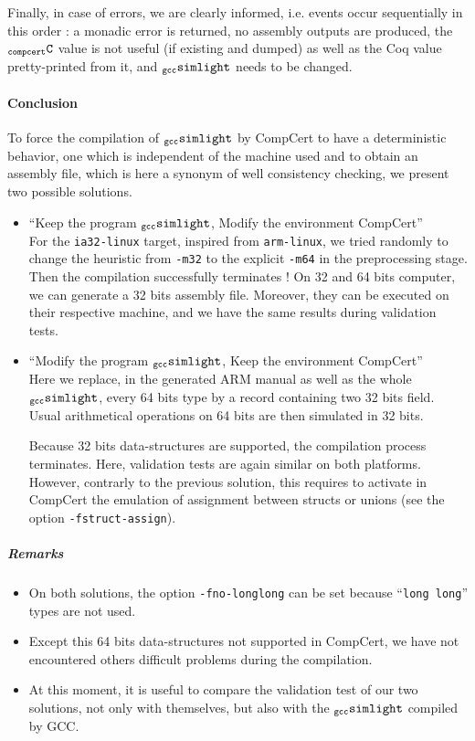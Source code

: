 \documentclass[a4paper, 11pt]{article}
\newcommand{\gccSL}{$_{\tt gcc}{\tt simlight}$\xspace}
\newcommand{\C}{$_{\tt compcert}{\tt C}$\xspace}
\begin{document}
Finally, in case of errors, we are clearly informed, i.e. events occur sequentially in this order : a monadic error is returned, no assembly outputs are produced, the \C value is not useful (if existing and dumped) as well as the Coq value pretty-printed from it, and \gccSL needs to be changed.

\paragraph{Conclusion}
To force the compilation of \gccSL by CompCert to have a deterministic behavior, one which is independent of the machine used and to obtain an assembly file, which is here a synonym of well consistency checking, we present two possible solutions.
\begin{itemize}
\item ``Keep the program \gccSL, Modify the environment CompCert''\\
For the \verb|ia32-linux| target, inspired from \verb|arm-linux|, we tried randomly to change the heuristic from \verb|-m32| to the explicit \verb|-m64| in the preprocessing stage. Then the compilation successfully terminates ! On 32 and 64 bits computer, we can generate a 32 bits assembly file. Moreover, they can be executed on their respective machine, and we have the same results during validation tests.

\item ``Modify the program \gccSL, Keep the environment CompCert''\\
Here we replace, in the generated ARM manual as well as the whole \gccSL, every 64 bits type by a record containing two 32 bits field. Usual arithmetical operations on 64 bits are then simulated in 32 bits. 

Because 32 bits data-structures are supported, the compilation process terminates. Here, validation tests are again similar on both platforms.
However, contrarly to the previous solution, this requires to activate in CompCert the emulation of assignment between structs or unions (see the option \verb|-fstruct-assign|). 
\end{itemize}
\subparagraph{Remarks}
\begin{itemize}
\item On both solutions, the option \verb|-fno-longlong| can be set because ``\verb|long long|'' types are not used.
\item Except this 64 bits data-structures not supported in CompCert, we have not encountered others difficult problems during the compilation.
\item At this moment, it is useful to compare the validation test of our two solutions, not only with themselves, but also with the \gccSL compiled by GCC.
\end{itemize}
\end{document}
